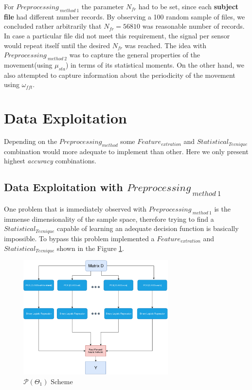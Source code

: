  For $Preprocessing_{ \ method \ 1}$ the parameter $N_{fr}$ had to be set, since each \textbf{subject file} had different number records. By observing a 100 random sample of files, we concluded rather arbitrarily that  $N_{fr}=56810$  was reasonable number of records. In case a particular file did not meet this requirement, the signal per sensor would repeat itself until the desired $N_{fr}$ was reached. The idea with $Preprocessing_{ \ method \ 2}$ was to capture the general properties of the movement(using $\mu_{sta}$) in terms of its statistical moments. On the other hand, we also attempted to capture information about the periodicity of the movement using $\omega_{fft}$.


\section{Data Exploitation}

Depending on the $Preprocessing_{method}$ some $Feature_{extration}$ and $Statistical_{Tecnique}$ combination would more adequate to implement than other. Here we only present highest \textit{accuracy} combinations.

\subsection{Data Exploitation with $Preprocessing_{ \ method \ 1}$}

One problem that is immediately observed with $Preprocessing_{ \ method \ 1}$ is the immense dimensionality of the sample space, therefore trying to find a $Statistical_{Tecnique}$  capable of learning an adequate decision function is basically impossible. To bypass this problem implemented a $Feature_{extration}$ and $Statistical_{Tecnique}$ shown in the Figure \ref{dig:p1}.


\begin{figure}[htpb!]
	\centering
	\includegraphics[width=0.7\textwidth]{images/scheme_1.pdf}
	\caption{$\mathcal{P}(\Theta_{1})$  Scheme}
	\label{dig:p1}
\end{figure}

